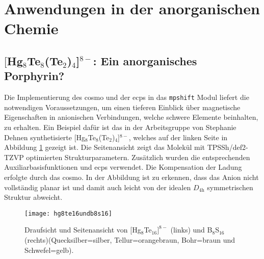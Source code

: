 \section{Anwendungen in der anorganischen Chemie}
\FloatBarrier
\subsection{\texorpdfstring{$[$Hg$_8$Te$_8$(Te$_2$)$_4$]$^{8-}$}{[Hg\_8Te\_8(Te\_2)\_4]8-}: Ein anorganisches Porphyrin?}\label{anorgporh}
Die Implementierung des \ac{cosmo}\supercite{klamt1993cosmo} und der \acp{ecp} in das \texttt{mpshift} Modul liefert die notwendigen Voraussetzungen, um einen tieferen Einblick über magnetische Eigenschaften in anionischen Verbindungen, welche schwere Elemente beinhalten, zu erhalten. Ein Beispiel dafür ist das in der Arbeitsgruppe von Stephanie Dehnen synthetisierte $[$Hg$_8$Te$_8$(Te$_2$)$_4$]$^{8-}$\supercite{dehnenhg4te8}, welches auf der linken Seite in Abbildung \ref{abb:hg8te16undb8s16} gezeigt ist. Die Seitenansicht zeigt das Molekül mit TPSSh\supercite{tao2003climbing}/def2-TZVP\supercite{weigend2005balanced} optimierten Strukturparametern. Zusätzlich wurden die entsprechenden Auxiliarbasisfunktionen\supercite{weigend2006accurate} und \acp{ecp}\supercite{peterson2003systematically} verwendet. Die Kompensation der Ladung erfolgte durch das \ac{cosmo}. In der Abbildung ist zu erkennen, dass das Anion nicht vollständig planar ist und damit auch leicht von der idealen $D_{4\textrm{h}}$ symmetrischen Struktur abweicht. 
\begin{figure}[ht!]
	\centering
	\texttt{[image: hg8te16undb8s16]}
	\captionsetup{figurewithin = chapter}
	\captionsetup{font=small, labelfont=bf}\caption[{Abbildung von $[$Hg$_8$Te$_{16}]^{8-}$ und B$_8$S$_{16}$}]{{Draufsicht und Seitenansicht von $[$Hg$_8$Te$_{16}]^{8-}$} (links) und B$_8$S$_{16}$ (rechts)(Quecksilber=silber, Tellur=orangebraun, Bohr=braun und Schwefel=gelb).}
\label{abb:hg8te16undb8s16}
\end{figure}

